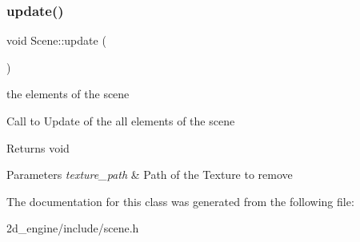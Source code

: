 \subsubsection{\texorpdfstring{update()}{update()}}
{\footnotesize\ttfamily void Scene\+::update (\begin{DoxyParamCaption}{ }\end{DoxyParamCaption})}

the elements of the scene

Call to Update of the all elements of the scene

\begin{DoxyReturn}{Returns}
void 
\end{DoxyReturn}

\begin{DoxyParams}{Parameters}
{\em texture\+\_\+path} & Path of the Texture to remove \\
\hline
\end{DoxyParams}


The documentation for this class was generated from the following file\+:\begin{DoxyCompactItemize}
\item 
2d\+\_\+engine/include/scene.\+h\end{DoxyCompactItemize}
